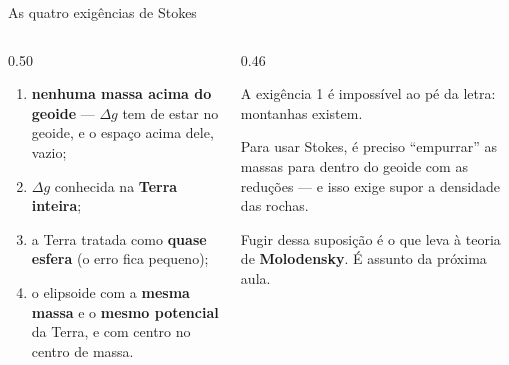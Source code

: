 \documentclass[aspectratio=169,11pt]{beamer}
\newcommand{\bnum}[1]{\textbf{\textcolor{mTeal}{#1}}}
\begin{document}
\begin{frame}{As quatro exigências de Stokes}
  \begin{columns}[T]
    \begin{column}{0.50\textwidth}
      \begin{cuidado}[title={Para a fórmula valer}]
        \small
        \begin{enumerate}
          \item \bnum{nenhuma massa acima do geoide} --- $\Delta g$ tem de estar no geoide,
                e o espaço acima dele, vazio;
          \item $\Delta g$ conhecida na \bnum{Terra inteira};
          \item a Terra tratada como \bnum{quase esfera} (o erro fica pequeno);
          \item o elipsoide com a \bnum{mesma massa} e o \bnum{mesmo potencial} da Terra, e
                com centro no centro de massa.
        \end{enumerate}
      \end{cuidado}
    \end{column}
    \begin{column}{0.46\textwidth}
      \begin{armadilha}[title={O calcanhar de Aquiles}]
        \small A exigência 1 é impossível ao pé da letra: \alert{montanhas existem}.
        \medskip

        Para usar Stokes, é preciso ``empurrar'' as massas para dentro do geoide com as
        reduções --- e isso exige \alert{supor a densidade das rochas}.
        \medskip

        Fugir dessa suposição é o que leva à teoria de \textbf{Molodensky}. É assunto da
        próxima aula.
      \end{armadilha}
    \end{column}
  \end{columns}
\end{frame}
\end{document}
